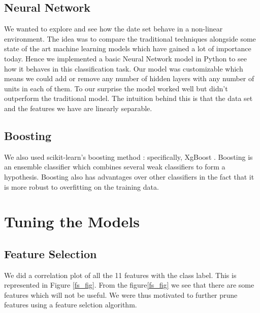\documentclass[conference]{IEEEtran}
\numberwithin{equation}{section}
\numberwithin{figure}{section}
\numberwithin{table}{section}
\begin{document}
\subsection{Neural Network}\label{sec:colour-illustrations}
We wanted to explore and see how the date set behave in a non-linear environment. The idea was to compare the traditional techniques alongside some state of the art machine learning models which have gained a lot of importance today. Hence we implemented a basic Neural Network model in Python to see how it behaves in this classification task. Our model was customizable which means we could add or remove any number of hidden layers with any number of units in each of them. To our surprise the model worked well but didn't outperform the traditional model. The intuition behind this is that the data set and the features we have are linearly separable. 

\subsection{Boosting}
We also used scikit-learn's boosting method : specifically, XgBoost \cite{xgboost}. Boosting is an ensemble classifier which combines several weak classifiers to form a hypothesis. Boosting also has advantages over other classifiers in the fact that it is more robust to overfitting on the training data. 

\section{Tuning the Models}
\subsection{Feature Selection}
We did a correlation plot of all the 11 features with the class label. 
This is represented in Figure \ref{fs_fig}. From the figure\ref{fs_fig} we see that there are some features which will not be useful. We were thus motivated to further prune features using a feature selction algorithm.
\end{document}
